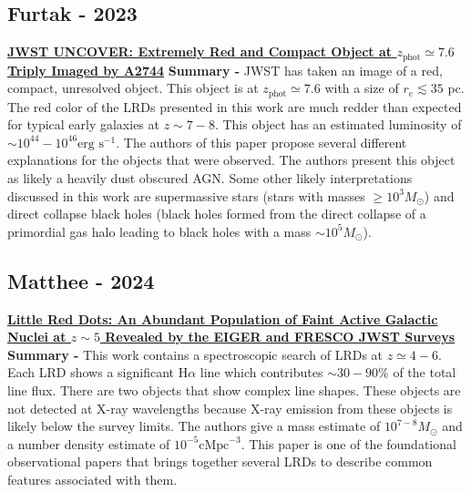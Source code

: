 \documentclass{article}
\begin{document}
\subsection*{Furtak - 2023}
\href{https://ui.adsabs.harvard.edu/abs/2023ApJ...952..142F/abstract}{\textbf{JWST UNCOVER: Extremely Red and Compact Object at $z_{\text{phot}} \simeq 7.6$ Triply Imaged by A2744}}
\newline \textbf{Summary -} JWST has taken an image of a red, compact, unresolved object. This object is at $z_{\text{phot}} \simeq 7.6$ with a size of $r_e \lesssim 35$ pc. The red color of the LRDs presented in this work are much redder than expected for typical early galaxies at $z \sim 7-8$. This object has an estimated luminosity of $\sim 10^{44} -10^{46} \text{erg s}^{-1}$. The authors of this paper propose several different explanations for the objects that were observed. The authors present this object as likely a heavily dust obscured AGN. Some other likely interpretations discussed in this work are supermassive stars (stars with masses $\geq 10^3 M_{\odot}$) and direct collapse black holes (black holes formed from the direct collapse of a primordial gas halo leading to black holes with a mass $\sim 10^5 M_{\odot}$). 

\subsection*{Matthee - 2024}
\href{https://ui.adsabs.harvard.edu/abs/2024ApJ...963..129M/abstract}{\textbf{Little Red Dots: An Abundant Population of Faint Active Galactic Nuclei at $z\sim 5$ Revealed by the EIGER and FRESCO JWST Surveys}}
\newline \textbf{Summary -} This work contains a spectroscopic search of LRDs at $z\simeq4-6$. Each LRD shows a significant H$\alpha$ line which contributes $\sim 30 - 90 \%$ of the total line flux. There are two objects that show complex line shapes. These objects are not detected at X-ray wavelengths because X-ray emission from these objects is likely below the survey limits. The authors give a mass estimate of $10^{7-8} M_{\odot}$ and a number density estimate of $10^{-5} \text{cMpc}^{-3}$. This paper is one of the foundational observational papers that brings together several LRDs to describe common features associated with them.
\end{document}
